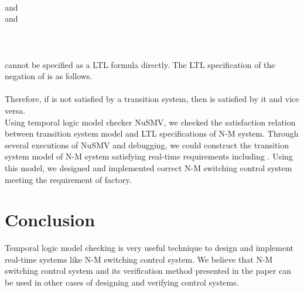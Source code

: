 \documentclass[runningheads,a4paper]{llncs}
\begin{document}
 \\

                

       and    \\

                 
 
      and   \\ 

                \\ 

\\

                                                                                                                                                                                           \\

 cannot be specified as a LTL formula directly. The LTL specification of the negation of  is as follows. \\

 \\

Therefore, if  is not satisfied by a transition system, then  is satisfied by it and vice versa. \\

Using temporal logic model checker NuSMV, we checked the satisfaction relation between transition system model and LTL specifications of N-M system. Through several executions of NuSMV and debugging, we could construct the transition system model of N-M system satisfying real-time requirements including . Using this model, we designed and implemented correct N-M switching control system meeting the requirement of factory. 


\section{Conclusion}
Temporal logic model checking is very useful technique to design and implement real-time systems like N-M switching control system. We believe that N-M switching control system and its verification method presented in the paper can be used in other cases of designing and verifying control systems. 
\end{document}
